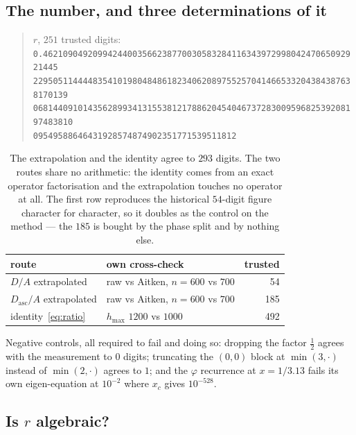 \documentclass[11pt]{article}
\begin{document}
\subsection{The number, and three determinations of it}

\begin{quote}\small
$r$, $251$ trusted digits:\\[2pt]
\texttt{0.4621090492099424400356623877003058328411634397299804247065092921445}\\
\texttt{22950511444483541019804848618234062089755257041466533204384387638170139}\\
\texttt{068144091014356289934131553812178862045404673728300959682539208197483810}\\
\texttt{09549588646431928574874902351771539511812}
\end{quote}

\begin{table}[H]
\centering\small
\begin{tabular}{l l r}
\toprule
route & own cross-check & trusted \\
\midrule
$D/A$ extrapolated & raw vs Aitken, $n=600$ vs $700$ & 54 \\
$D_{\mathrm{asc}}/A$ extrapolated & raw vs Aitken, $n=600$ vs $700$ & 185 \\
identity~\eqref{eq:ratio} & $h_{\max}$ $1200$ vs $1000$ & 492 \\
\bottomrule
\end{tabular}
\caption{The extrapolation and the identity agree to $293$ digits. The two
routes share no arithmetic: the identity comes from an exact operator
factorisation and the extrapolation touches no operator at all. The first row
reproduces the historical $54$-digit figure character for character, so it
doubles as the control on the method --- the $185$ is bought by the phase split
and by nothing else.}
\label{tab:ratio}
\end{table}

Negative controls, all required to fail and doing so: dropping the factor
$\tfrac12$ agrees with the measurement to $0$ digits; truncating the $(0,0)$
block at $\min(3,\cdot)$ instead of $\min(2,\cdot)$ agrees to $1$; and the
$\varphi$ recurrence at $x = 1/3.13$ fails its own eigen-equation at $10^{-2}$
where $x_c$ gives $10^{-528}$.

\subsection{Is $r$ algebraic?}
\end{document}
